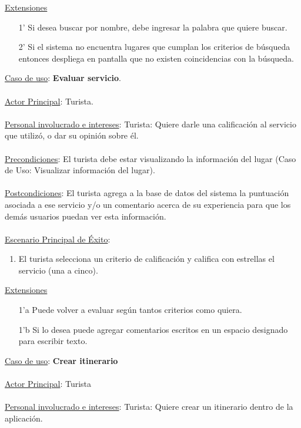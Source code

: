 \documentclass[12pt]{article}
\begin{document}
\underline{Extensiones}
\begin{enumerate}
\item[1'] Si desea buscar por nombre, debe ingresar la palabra que quiere buscar.
\item[2'] Si el sistema no encuentra lugares que cumplan los criterios de búsqueda entonces despliega en pantalla que no existen coincidencias con la búsqueda.
\end{enumerate}
\underline{Caso de uso}: \textbf{Evaluar servicio}.\\\\
\underline{Actor Principal}: Turista.\\\\
\underline{Personal involucrado e intereses}: Turista: Quiere darle una calificación al servicio que utilizó, o dar su opinión sobre él.\\\\
\underline{Precondiciones}: El turista debe estar visualizando la información del lugar (Caso de Uso: Visualizar información del lugar).\\\\
\underline{Postcondiciones}: El turista agrega a la base de datos del sistema la puntuación asociada a ese servicio y/o un comentario acerca de su experiencia para que los demás usuarios puedan ver esta información.\\\\
\underline{Escenario Principal de Éxito}:
\begin{enumerate}
\item El turista selecciona un criterio de calificación y califica con estrellas el servicio (una a cinco).
\end{enumerate}
\underline{Extensiones}
\begin{enumerate}
\item[1'a] Puede volver a evaluar según tantos criterios como quiera.
\item[1'b] Si lo desea puede agregar comentarios escritos en un espacio designado para escribir texto. 
\end{enumerate}
\underline{Caso de uso}: \textbf{Crear itinerario}\\\\
\underline{Actor Principal}: Turista\\\\
\underline{Personal involucrado e intereses}: Turista: Quiere crear un itinerario dentro de la aplicación.\\\\
\end{document}
